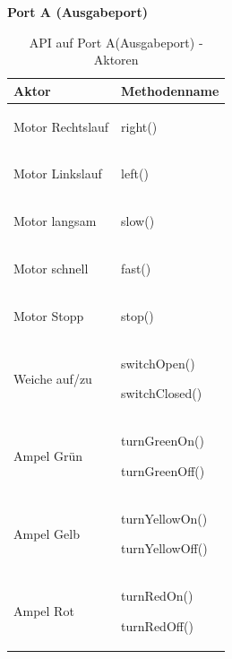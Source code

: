 \documentclass[a4paper, 11pt]{article}
\begin{document}
\noindent \textbf{Port A (Ausgabeport)}
\begin{table}[H]
\center
    \begin{tabularx}{\textwidth}{|X|X|}
    \hline
    \textbf{Aktor}&\textbf{Methodenname}\\
     \hline
    Motor Rechtslauf&\begin{compactenum}[]
        \item \ttfamily right()
        \end{compactenum}\\
    \hline
    Motor Linkslauf&\begin{compactenum}[]
        \item \ttfamily left()
    \end{compactenum}\\
    \hline
    Motor langsam&\begin{compactenum}[]
        \item \ttfamily slow()
    \end{compactenum}\\
    \hline
    Motor schnell&\begin{compactenum}[]
           \item \ttfamily fast()
    \end{compactenum}\\
    \hline
    Motor Stopp&\begin{compactenum}[]
        \item \ttfamily stop()
    \end{compactenum}\\
    \hline
    Weiche auf/zu&\begin{compactenum}[]
        \item \ttfamily switchOpen()
        \item \ttfamily switchClosed()
    \end{compactenum}\\
    \hline
    Ampel Grün&\begin{compactenum}[]
        \item \ttfamily turnGreenOn()
        \item \ttfamily turnGreenOff()
    \end{compactenum}\\
    \hline
    Ampel Gelb&\begin{compactenum}[]
        \item \ttfamily turnYellowOn()
        \item \ttfamily turnYellowOff()
    \end{compactenum}\\
    \hline
    Ampel Rot&\begin{compactenum}[]
        \item \ttfamily turnRedOn()
        \item \ttfamily turnRedOff()
    \end{compactenum}\\
    \hline
    \end{tabularx}
    \caption{API auf Port A(Ausgabeport) - Aktoren}
    \label{portA}
\end{table}
\end{document}
